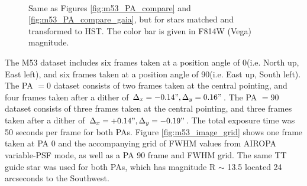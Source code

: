 \documentclass[]{spie}  %
\begin{document}
\begin{figure}[!h]
  \centering
  \\
  \hspace{-1cm}
  \caption{Same as Figures \ref{fig:m53_PA_compare} and \ref{fig:m53_PA_compare_gaia}, but for stars matched and transformed to HST. The color bar is given in F814W (Vega) magnitude.} \label{fig:m53_PA_compare_hst}
\end{figure}

The M53 dataset includes six frames taken at a position angle of 0\degree (i.e. North up, East left), and six frames taken at a position angle of 90\degree (i.e. East up, South left). The PA $=0$ dataset consists of two frames taken at the central pointing, and four frames taken after a dither of $\Delta_x = -0.14", \Delta_y = 0.16"$. The PA $=90$ dataset consists of three frames taken at the central pointing, and three frames taken after a dither of $\Delta_x = +0.14", \Delta_y = -0.19"$. The total exposure time was 50 seconds per frame for both PAs. Figure \ref{fig:m53_image_grid} shows one frame taken at PA 0 and the accompanying grid of FWHM values from AIROPA variable-PSF mode, as well as a PA 90 frame and FWHM grid. The same TT guide star was used for both PAs, which has magnitude R ${\sim}$ 13.5 located 24 arcseconds to the Southwest.
\end{document}
